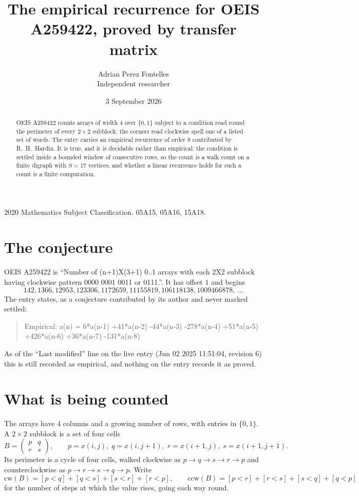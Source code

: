 \documentclass[11pt,a4paper]{article}
\title{The empirical recurrence for OEIS A259422, proved by transfer matrix}
\author{Adrian Perez Fontelles\\ \small Independent researcher}
\date{3 September 2026}
\theoremstyle{plain}
\theoremstyle{definition}
\begin{document}
\maketitle

\begin{abstract}
OEIS A259422 counts arrays of width $4$ over $\{0,1\}$ subject to a condition read round the
perimeter of every $2\times2$ subblock: the corners read clockwise spell one of a listed set of words. The entry carries an empirical recurrence of
order $8$ contributed by R.~H.~Hardin. It is true, and it is decidable rather than
empirical: the condition is settled inside a bounded window of consecutive rows, so the
count is a walk count on a finite digraph with $S=17$ vertices, and whether a linear
recurrence holds for such a count is a finite computation.
\end{abstract}

\noindent\small 2020 Mathematics Subject Classification. 05A15, 05A16, 15A18.\normalsize

\section{The conjecture}

OEIS A259422 is ``Number of (n+1)X(3+1) 0..1 arrays with each 2X2 subblock having clockwise pattern 0000 0001 0011 or 0111.''. It has offset $1$ and begins
\[
142, 1366, 12953, 123306, 1172659, 11155819, 106118138, 1009466878,\ \dots
\]
The entry states, as a conjecture contributed by its author and never marked settled:
\begin{quote}
Empirical: a(n) = 6*a(n-1) +41*a(n-2) -44*a(n-3) -278*a(n-4) +51*a(n-5) +426*a(n-6) +36*a(n-7) -131*a(n-8)
\end{quote}
As of the ``Last modified'' line on the live entry (Jun 02 2025 11:51:04, revision 6) this is still
recorded as empirical, and nothing on the entry records it as proved.

\section{What is being counted}

The arrays have $4$ columns and a growing number of rows, with entries in $\{0,1\}$. A
$2\times2$ subblock is a set of four cells
\[
B=\begin{pmatrix} p & q \\ r & s \end{pmatrix},
\qquad p=x(i,j),\; q=x(i,j+1),\; r=x(i+1,j),\; s=x(i+1,j+1).
\]
Its perimeter is a cycle of four cells, walked clockwise as $p\to q\to s\to r\to p$ and
counterclockwise as $p\to r\to s\to q\to p$. Write
\[
\mathrm{cw}(B)=[p<q]+[q<s]+[s<r]+[r<p],\qquad
\mathrm{ccw}(B)=[p<r]+[r<s]+[s<q]+[q<p]
\]
for the number of steps at which the value rises, going each way round.
\end{document}

